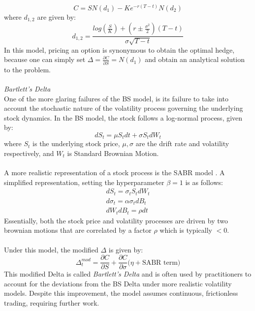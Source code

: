 \documentclass{article}
\begin{document}
\begin{equation}
    C = SN(d_1)-Ke^{-r(T-t)}N(d_2)
\end{equation}
where $d_{1,2}$ are given by:
\begin{equation}
    d_{1,2} = \frac{log(\frac{S}{K})+(r\pm\frac{\sigma^2}{2})(T-t)}{\sigma\sqrt{T-t}}
\end{equation}
In this model, pricing an option is synonymous to obtain the optimal hedge, because one can simply set $\Delta = \frac{\partial C}{\partial S} = N(d_1)$ and obtain an analytical solution to the problem.\\\\
\textit{Bartlett's Delta}\\One of the more glaring failures of the BS model, is its failure to take into account the stochastic nature of the volatility process governing the underlying stock dynamics. In the BS model, the stock follows a log-normal process, given by:
\begin{equation}
    dS_t = \mu S_tdt+\sigma S_tdW_t
\end{equation}
where $S_t$ is the underlying stock price, $\mu, \sigma$ are the drift rate and volatility respectively, and $W_t$ is Standard Brownian Motion.\\\\
A more realistic representation of a stock process is the SABR model \cite{bartlett}. A simplified representation, setting the hyperparameter $\beta = 1$ is as follows:
\begin{align}
dS_t = \sigma_tS_tdW_t\label{eq:spot}\\
d\sigma_t=\alpha\sigma_tdB_t\\
dW_tdB_t = \rho dt
\end{align}
Essentially, both the stock price and volatility processes are driven by two brownian motions that are correlated by a factor $\rho$ which is typically $<0$.\\\\
Under this model, the modified $\Delta$ is given by:
\begin{equation}
    \Delta^{mod}_t = \frac{\partial C}{\partial S} +\frac{\partial C}{\partial \sigma} \bigg( \eta + \text{SABR term}\bigg)
\end{equation}
This modified Delta is called \textit{Bartlett's Delta} and is often used by practitioners to account for the deviations from the BS Delta under more realistic volatility models. Despite this improvement, the model assumes continuous, frictionless trading, requiring further work.
\end{document}
